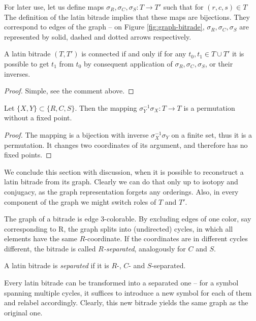 \noindent
For later use, let us define maps $\sigma_R, \sigma_C, \sigma_S : T \rightarrow T'$ such that for $(r,c,s) \in T$
The definition of the latin bitrade implies that these maps are bijections. They correspond to edges of the graph -- on Figure \ref{fig:graph-bitrade},  $\sigma_R, \sigma_C, \sigma_S$ are represented by solid, dashed and dotted arrows respectively.

\begin{lem}
A latin bitrade $(T,T')$ is connected if and only if for any $t_0,t_1 \in T \cup T'$ it is possible to get $t_1$ from $t_0$ by consequent application of $\sigma_R, \sigma_C, \sigma_S$, or their inverses.
\end{lem}
\begin{proof}
Simple, see the comment above.
\end{proof}

\begin{lem}
Let $\{X,Y\} \subset \{R,C,S\}$. Then the mapping $\sigma_Y^{-1}\sigma_X : T \rightarrow T$ is a permutation without a fixed point.
\end{lem}
\begin{proof}
The mapping is a bijection with inverse $\sigma_X^{-1}\sigma_Y$ on a finite set, thus it is a permutation. It changes two coordinates of its argument, and therefore has no fixed points.
\end{proof}

We conclude this section with discussion, when it is possible to reconstruct a latin bitrade from its graph. Clearly we can do that only up to isotopy and conjugacy, as the graph representation forgets any orderings. Also, in every component of the graph we might switch roles of $T$ and $T'$.

The graph of a bitrade is edge 3-colorable. By excluding edges of one color, say corresponding to  R, the graph splits into (undirected) cycles, in which all elements have the same $R$-coordinate. If the coordinates are in different cycles different, the bitrade is called \emph{$R$-separated}, analogously for $C$ and $S$.

\begin{defn}
 A latin bitrade is \emph{separated} if it is $R$-, $C$- and $S$-separated.
\end{defn}

Every latin bitrade can be transformed into a separated one -- for a symbol spanning multiple cycles, it suffices to introduce a new symbol for each of them and relabel accordingly. Clearly, this new bitrade yields the same graph as the original one.

